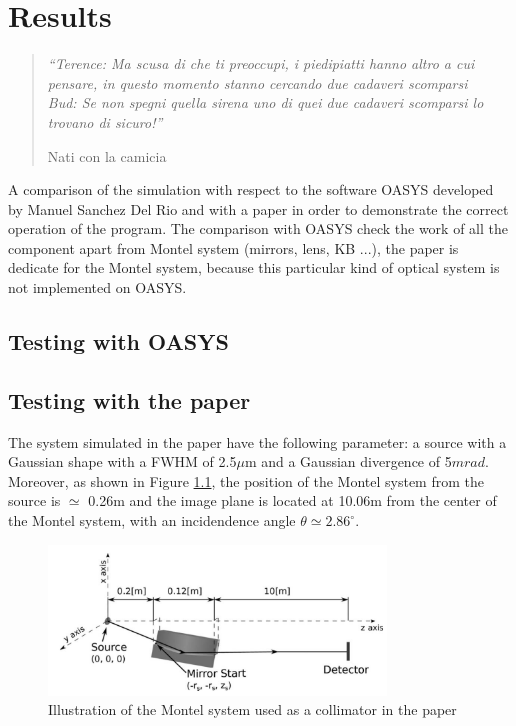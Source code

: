 \chapter{Results}
\label{capitolo5}


\begin{quotation}
{\footnotesize
\noindent \emph{``Terence: Ma scusa di che ti preoccupi, i piedipiatti hanno altro a cui pensare, in questo momento stanno cercando due cadaveri scomparsi \\
Bud: Se non spegni quella sirena uno di quei due cadaveri scomparsi lo trovano di sicuro!''}
\begin{flushright}
Nati con la camicia
\end{flushright}
}
\end{quotation}
\vspace{0.5cm}

\noindent A comparison of the simulation with respect to the software OASYS developed by Manuel Sanchez Del Rio and with a paper \cite{resta2015nested} in order to demonstrate the correct operation of the program. The comparison with OASYS check the work of all the component apart from Montel system (mirrors, lens, KB ...), the paper is dedicate for the Montel system, because this particular kind of optical system is not implemented on OASYS.

\section{Testing with OASYS}

\section{Testing with the paper}
The system simulated in the paper have the following parameter: a source with a Gaussian shape with a FWHM of 2.5$\mu $m and a Gaussian divergence of 5$mrad $. Moreover, as shown in Figure \ref{fig: PaperMontelSystem}, the position of the Montel system from the source is $\simeq $ 0.26m and the image plane is located at 10.06m from the center of the Montel system, with an incidendence angle $\theta \simeq 2.86^{\circ} $.

\begin{figure}[H]
	\centering
		\includegraphics[width=0.8\textwidth]{Immagini/Chapter5/PaperMontelSystem}
		\caption{Illustration of the Montel system used as a collimator in the paper \cite{resta2015nested}}
		\label{fig: PaperMontelSystem}
\end{figure}

